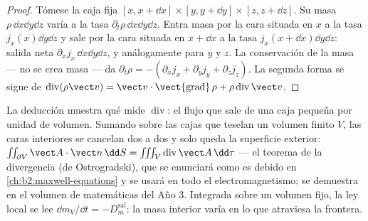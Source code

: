 \begin{proof}
Tómese la caja fija $[x, x + \dd x]\times[y, y + \dd y]\times[z, z + \dd z]$.
Su masa $\rho\,\dd x\dd y\dd z$ varía a la tasa $\partial_t\rho\,\dd x\dd y
\dd z$. Entra masa por la cara situada en $x$ a la tasa $j_x(x)\dd y\dd z$
y sale por la cara situada en $x + \dd x$ a la tasa $j_x(x + \dd x)\dd y\dd z$:
salida neta $\partial_xj_x\,\dd x\dd y\dd z$, y análogamente para $y$ y $z$.
La conservación de la masa --- no se crea masa --- da $\partial_t\rho = -
(\partial_xj_x + \partial_yj_y + \partial_zj_z)$. La segunda forma se sigue de
$\operatorname{div}(\rho\vect v) = \vect v\cdot\operatorname{\vect{grad}}\rho +
\rho\operatorname{div}\vect v$.
\end{proof}

\begin{remark}\label{rem:b2:fluid-kinematics:divergence}
La deducción muestra qué mide $\operatorname{div}$: el flujo que sale de
una caja pequeña por unidad de volumen. Sumando sobre las cajas que
teselan un volumen finito $V$, las caras interiores se cancelan dos a dos
y solo queda la superficie exterior: $\iint_{\partial V}\vect A\cdot\vect n\,\dd S = \iiint_V
\operatorname{div}\vect A\,\dd\tau$ --- el teorema de la divergencia (de
Ostrogradski), que se enunciará como es debido en
\cref{ch:b2:maxwell-equations} y se usará en todo el electromagnetismo; se
demuestra en el volumen de matemáticas del Año 3. Integrada sobre un
volumen fijo, la ley local se lee $\dd m_V/\dd t = -D_m^{\text{sal}}$: la
masa interior varía en lo que atraviesa la frontera.
\end{remark}

